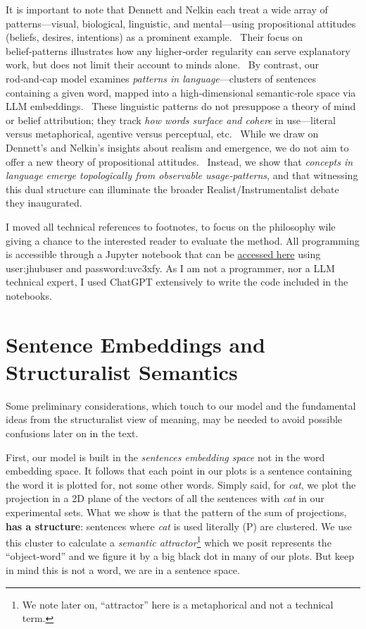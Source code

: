 \documentclass[12pt]{article}
\begin{document}
It is important to note that Dennett and Nelkin each treat a wide array of patterns---visual, biological, linguistic, and mental---using propositional attitudes (beliefs, desires, intentions) as a prominent example.~ Their focus on belief‑patterns illustrates how any higher‑order regularity can serve explanatory work, but does not limit their account to minds alone.~ By contrast, our rod‑and‑cap model examines \emph{patterns in language}---clusters of sentences containing a given word, mapped into a high‑dimensional semantic‑role space via LLM embeddings.~ These linguistic patterns do not presuppose a theory of mind or belief attribution; they track \emph{how words surface and cohere} in use---literal versus metaphorical, agentive versus perceptual, etc.~ While we draw on Dennett's and Nelkin's insights about realism and emergence, we do not aim to offer a new theory of propositional attitudes.~ Instead, we show that \emph{concepts in language emerge topologically from observable usage‑patterns}, and that witnessing this dual structure can illuminate the broader Realist/Instrumentalist debate they inaugurated.

I moved all technical references to footnotes, to focus on the philosophy wile giving a chance to the interested reader to evaluate the method. All programming is accessible through a Jupyter notebook that can be \href{https://jupyter.antimaterie.ro/user/jhubuser/notebooks/HomepageTopologicalSemantics.ipynb}{accessed here} using user:jhubuser and password:uvc3xfy. As I am not a programmer, nor a LLM technical expert, I used ChatGPT extensively to write the code included in the notebooks.

\section{Sentence Embeddings and Structuralist Semantics}\label{sentence-embeddings-and-structuralist-semantics}

Some preliminary considerations, which touch to our model and the fundamental ideas from the structuralist view of meaning, may be needed to avoid possible confusions later on in the text.

First, our model is built in the \emph{sentences embedding space} not in the word embedding space. It follows that each point in our plots is a sentence containing the word it is plotted for, not some other words. Simply said, for \emph{cat}, we plot the projection in a 2D plane of the vectors of all the sentences with \emph{cat} in our experimental sets. What we show is that the pattern of the sum of projections, \textbf{has a structure}: sentences where \emph{cat} is used literally (P) are clustered. We use this cluster to calculate a \emph{semantic attractor}\footnote{We note later on, ``attractor'' here is a metaphorical and not a technical term.} which we posit represents the ``object-word'' and we figure it by a big black dot in many of our plots. But keep in mind this is not a word, we are in a sentence space.
\end{document}
